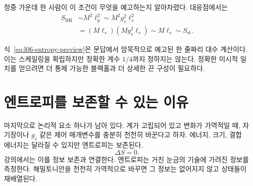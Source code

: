 청중 가운데 한 사람이 이 조건이 무엇을 예고하는지 알아차렸다. 대응점에서는
\begin{align}
S_{\mathrm{BH}}
&\sim M^2\ell_p^2
\sim M^2g_s^2\ell_s^2 \\
&=(M\ell_s)(Mg_s^2\ell_s)
\sim M\ell_s
\sim S_{\mathrm{st}}.
\label{eq:l06-entropy-preview}
\end{align}

\begin{classroomqa}
\end{classroomqa}

식~\eqref{eq:l06-entropy-preview}은 문답에서 암묵적으로 예고된 한 줄짜리 대수 계산이다. 이는 스케일링을 확립하지만 정확한 계수 \(1/4\)까지 정하지는 않는다. 정확한 미시적 일치를 얻으려면 더 통제 가능한 블랙홀과 더 상세한 끈 구성이 필요하다.

\section{엔트로피를 보존할 수 있는 이유}

마지막으로 논리적 요소 하나가 남아 있다. 계가 고립되어 있고 변화가 가역적일 때, 자기장이나 \(g_s\) 같은 제어 매개변수를 충분히 천천히 바꾼다고 하자. 에너지, 크기, 결합 에너지는 달라질 수 있지만 엔트로피는 보존된다.
\begin{equation}
\Delta S=0.
\label{eq:l06-adiabatic-entropy}
\end{equation}
강의에서는 이를 정보 보존과 연결한다. 엔트로피는 거친 눈금의 기술에 가려진 정보를 측정한다. 해밀토니안을 천천히 가역적으로 바꾸면 그 정보는 없어지지 않고 상태들이 재배열된다.

\begin{classroomqa}
\end{classroomqa}

